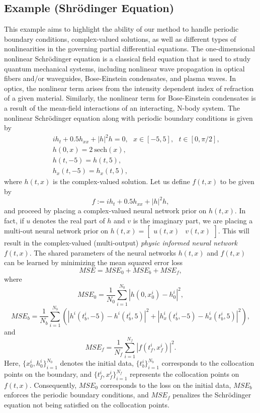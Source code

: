 \documentclass[preprint,12pt]{elsarticle}
\begin{document}
\subsection{Example (Shr\"{o}dinger Equation)} \label{sec:schrodinger_CT}
This example aims to highlight the ability of our method to handle periodic boundary conditions, complex-valued solutions, as well as different types of nonlinearities in the governing partial differential equations. The one-dimensional nonlinear Schr\"{o}dinger equation is a classical field equation that is used to study quantum mechanical systems, including nonlinear wave propagation in optical fibers and/or waveguides, Bose-Einstein condensates, and plasma waves. In optics, the nonlinear term arises from the intensity dependent index of refraction of a given material. Similarly, the nonlinear term for Bose-Einstein condensates is a result of the mean-field interactions of an interacting, N-body system. The nonlinear Schr\"{o}dinger equation along with periodic boundary conditions is given by
\begin{eqnarray}\label{eq:Schrodinger}
&& i h_t + 0.5 h_{xx} + |h|^2 h = 0,\ \ \ x \in [-5, 5],\ \ \ t \in [0, \pi/2],\\
&& h(0,x) = 2\ \text{sech}(x),\nonumber\\
&& h(t,-5) = h(t, 5),\nonumber\\
&& h_x(t,-5) = h_x(t, 5),\nonumber
\end{eqnarray}
where $h(t,x)$ is the complex-valued solution. Let us define $f(t,x)$ to be given by
\[
f := i h_t + 0.5 h_{xx} + |h|^2 h,
\]
and proceed by placing a complex-valued neural network prior on $h(t,x)$. In fact, if $u$ denotes the real part of $h$ and $v$ is the imaginary part, we are placing a multi-out neural network prior on $h(t,x) = \begin{bmatrix}
u(t,x) & v(t,x)
\end{bmatrix}$. This will result in the complex-valued (multi-output) \emph{physic informed neural network} $f(t,x)$. The shared parameters of the neural networks $h(t,x)$ and $f(t,x)$ can be learned by minimizing the mean squared error loss
\begin{equation}\label{eq:MSE_Schrodinger}
MSE = MSE_0 + MSE_b + MSE_f,
\end{equation}
where
\[
MSE_0 = \frac{1}{N_0}\sum_{i=1}^{N_0} |h(0,x_0^i) - h^i_0|^2,
\]
\[
MSE_b = \frac{1}{N_b}\sum_{i=1}^{N_b} \left(|h^i(t^i_b,-5) - h^i(t^i_b,5)|^2 + |h^i_x(t^i_b,-5) - h^i_x(t^i_b,5)|^2\right),
\]
and
\[
MSE_f = \frac{1}{N_f}\sum_{i=1}^{N_f}|f(t_f^i,x_f^i)|^2.
\]
Here, $\{x_0^i, h^i_0\}_{i=1}^{N_0}$ denotes the initial data, $\{t^i_b\}_{i=1}^{N_b}$ corresponds to the collocation points on the boundary, and $\{t_f^i,x_f^i\}_{i=1}^{N_f}$ represents the collocation points on $f(t,x)$. Consequently, $MSE_0$ corresponds to the loss on the initial data, $MSE_b$ enforces the periodic boundary conditions, and $MSE_f$ penalizes the Schr\"{o}dinger equation not being satisfied on the collocation points.\\
\end{document}
